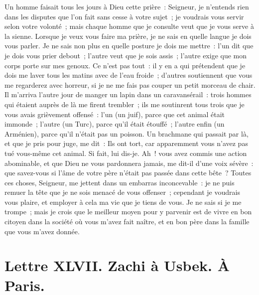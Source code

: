 \documentclass[french,twoside]{book} %
\newcommand{\dateline}[1]{\medskip{\RaggedLeft{#1}\par}\bigskip}
\begin{document}
Un homme faisait tous les jours à Dieu cette prière : Seigneur, je n’entends rien dans les disputes que l’on fait sans cesse à votre sujet ; je voudrais vous servir selon votre volonté ; mais chaque homme que je consulte veut que je vous serve à la sienne. Lorsque je veux vous faire ma prière, je ne sais en quelle langue je dois vous parler. Je ne sais non plus en quelle posture je dois me mettre : l’un dit que je dois vous prier debout ; l’autre veut que je sois assis ; l’autre exige que mon corps porte sur mes genoux. Ce n’est pas tout : il y en a qui prétendent que je dois me laver tous les matins avec de l’eau froide ; d’autres soutiennent que vous me regarderez avec horreur, si je ne me fais pas couper un petit morceau de chair. Il m’arriva l’autre jour de manger un lapin dans un caravansérail : trois hommes qui étaient auprès de là me firent trembler ; ils me soutinrent tous trois que je vous avais grièvement offensé : l’un (un juif), parce que cet animal était immonde ; l’autre (un Turc), parce qu’il était étouffé ; l’autre enfin (un Arménien), parce qu’il n’était pas un poisson. Un brachmane qui passait par là, et que je pris pour juge, me dit : Ils ont tort, car apparemment vous n’avez pas tué vous-même cet animal. Si fait, lui dis-je. Ah ! vous avez commis une action abominable, et que Dieu ne vous pardonnera jamais, me dit-il d’une voix sévère : que savez-vous si l’âme de votre père n’était pas passée dans cette bête ? Toutes ces choses, Seigneur, me jettent dans un embarras inconcevable : je ne puis remuer la tête que je ne sois menacé de vous offenser ; cependant je voudrais vous plaire, et employer à cela ma vie que je tiens de vous. Je ne sais si je me trompe ; mais je crois que le meilleur moyen pour y parvenir est de vivre en bon citoyen dans la société où vous m’avez fait naître, et en bon père dans la famille que vous m’avez donnée.\par

\dateline{À Paris, le 8 de la lune de Chahban, 1713.}
\section[{Lettre XLVII. Zachi à Usbek. À Paris.}]{Lettre XLVII. Zachi à Usbek. À Paris.}\renewcommand{\leftmark}{Lettre XLVII. Zachi à Usbek. À Paris.}
\end{document}
